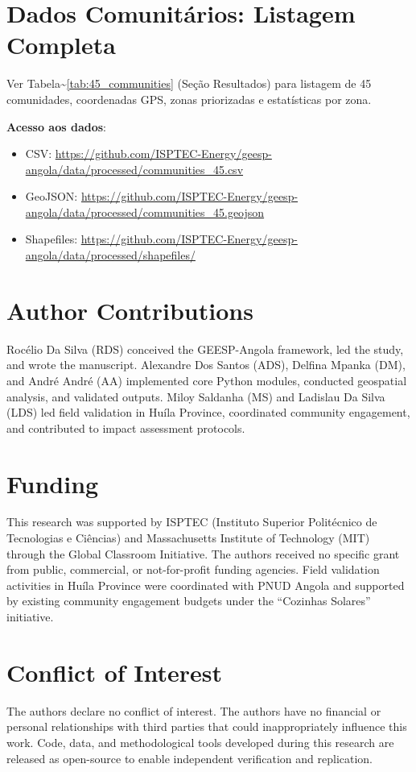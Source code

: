 \documentclass[12pt, a4paper]{article}
\begin{document}
\section{Dados Comunitários: Listagem Completa}
\label{app:community_data}

Ver Tabela\textasciitilde{}\ref{tab:45_communities} (Seção Resultados) para listagem de 45 comunidades, coordenadas GPS, zonas priorizadas e estatísticas por zona.

\textbf{Acesso aos dados}:
\begin{itemize}
\item CSV: \url{https://github.com/ISPTEC-Energy/geesp-angola/data/processed/communities\_45.csv}
\item GeoJSON: \url{https://github.com/ISPTEC-Energy/geesp-angola/data/processed/communities\_45.geojson}
\item Shapefiles: \url{https://github.com/ISPTEC-Energy/geesp-angola/data/processed/shapefiles/}
\end{itemize}

\section*{Author Contributions}
Rocélio Da Silva (RDS) conceived the GEESP-Angola framework, led the study, and wrote the manuscript. Alexandre Dos Santos (ADS), Delfina Mpanka (DM), and André André (AA) implemented core Python modules, conducted geospatial analysis, and validated outputs. Miloy Saldanha (MS) and Ladislau Da Silva (LDS) led field validation in Huíla Province, coordinated community engagement, and contributed to impact assessment protocols.

\section*{Funding}
This research was supported by ISPTEC (Instituto Superior Politécnico de Tecnologias e Ciências) and Massachusetts Institute of Technology (MIT) through the Global Classroom Initiative. The authors received no specific grant from public, commercial, or not-for-profit funding agencies. Field validation activities in Huíla Province were coordinated with PNUD Angola and supported by existing community engagement budgets under the ``Cozinhas Solares'' initiative.

\section*{Conflict of Interest}
The authors declare no conflict of interest. The authors have no financial or personal relationships with third parties that could inappropriately influence this work. Code, data, and methodological tools developed during this research are released as open-source to enable independent verification and replication.
\end{document}
